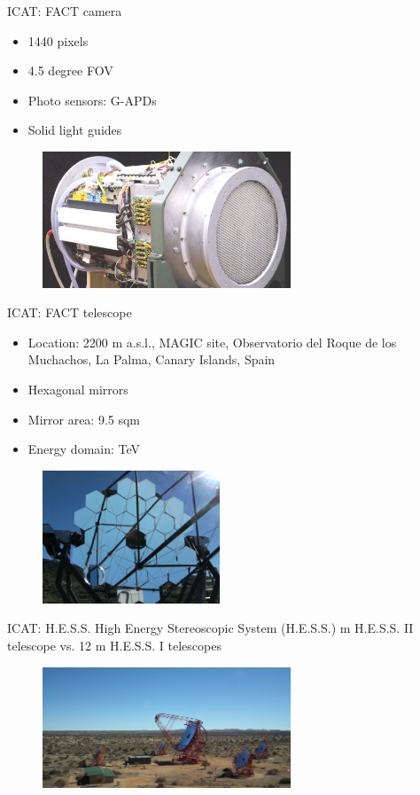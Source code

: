 \documentclass{beamer}
\begin{document}
\begin{frame}{ICAT: FACT camera}
	\begin{itemize}
		\item 1440 pixels
		\item 4.5 degree FOV
		\item Photo sensors: G-APDs
		\item Solid light guides
	\end{itemize}
	\begin{figure}[h]
		\includegraphics[width=280px]{ICATcamera.jpg}
	\end{figure}
\end{frame}



\begin{frame}{ICAT: FACT telescope}
	\begin{itemize}
		\item Location: 2200 m a.s.l., MAGIC site, Observatorio del Roque de los Muchachos, La Palma, Canary Islands, Spain
		\item Hexagonal mirrors
		\item Mirror area: 9.5 sqm
		\item Energy domain: TeV
	\end{itemize}
	\begin{figure}[h]
		\includegraphics[width=200px]{FACTtelescope.jpg}
	\end{figure}
\end{frame}

\begin{frame}{ICAT: H.E.S.S.}
	High Energy Stereoscopic System (H.E.S.S.)
	 m H.E.S.S. II telescope vs. 12 m H.E.S.S. I telescopes
	\begin{figure}[h]
		\includegraphics[width=280px]{Array_overviewS.jpg}
	\end{figure}
\end{frame}
\end{document}
